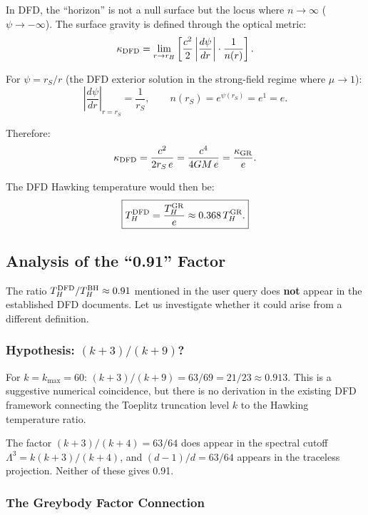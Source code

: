 \documentclass[11pt,a4paper]{article}
\begin{document}
In DFD, the ``horizon'' is not a null surface but the locus where $n \to \infty$ ($\psi \to -\infty$). The surface gravity is defined through the optical metric:
\begin{equation}
\kappa_{\rm DFD} = \lim_{r \to r_H}\left[\frac{c^2}{2}\left|\frac{d\psi}{dr}\right|\cdot\frac{1}{n(r)}\right].
\end{equation}

For $\psi = r_S/r$ (the DFD exterior solution in the strong-field regime where $\mu \to 1$):
\begin{equation}
\left|\frac{d\psi}{dr}\right|_{r=r_S} = \frac{1}{r_S}, \qquad n(r_S) = e^{\psi(r_S)} = e^1 = e.
\end{equation}

Therefore:
\begin{equation}
\kappa_{\rm DFD} = \frac{c^2}{2r_S\,e} = \frac{c^4}{4GM\,e} = \frac{\kappa_{\rm GR}}{e}.
\end{equation}

The DFD Hawking temperature would then be:
\begin{equation}\label{eq:TDFD}
\boxed{T_H^{\rm DFD} = \frac{T_H^{\rm GR}}{e} \approx 0.368\,T_H^{\rm GR}.}
\end{equation}

\subsection{Analysis of the ``0.91'' Factor}

The ratio $T_H^{\rm DFD}/T_H^{\rm BH} \approx 0.91$ mentioned in the user query does \textbf{not} appear in the established DFD documents. Let us investigate whether it could arise from a different definition.

\subsubsection{Hypothesis: $(k+3)/(k+9)$?}

For $k = k_{\max} = 60$: $(k+3)/(k+9) = 63/69 = 21/23 \approx 0.913$. This is a suggestive numerical coincidence, but there is no derivation in the existing DFD framework connecting the Toeplitz truncation level $k$ to the Hawking temperature ratio.

The factor $(k+3)/(k+4) = 63/64$ does appear in the spectral cutoff $\Lambda^3 = k(k+3)/(k+4)$, and $(d-1)/d = 63/64$ appears in the traceless projection. Neither of these gives 0.91.

\subsubsection{The Greybody Factor Connection}
\end{document}
